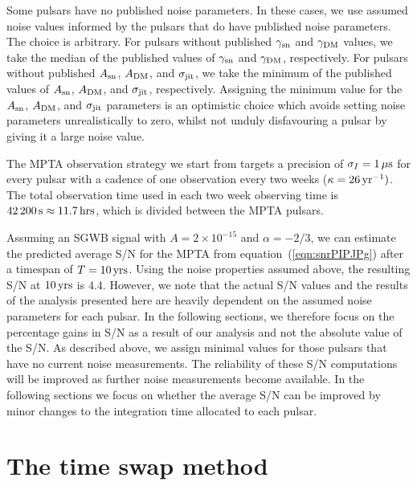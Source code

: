 \documentclass[fleqn,usenatbib]{mnras}
\newcommand{\ARed}{A_{\rm sn}}
\newcommand{\ADM}{A_{\rm DM}}
\newcommand{\TwoWkObsTimeHrs}{11.7}
\newcommand{\TwoWkObsTimeS}{42\,200}
\begin{document}
Some pulsars have no published noise parameters. 
In these cases, we use assumed noise values informed by the pulsars that do have published noise parameters. 
The choice is arbitrary. 
For pulsars without published $\gamma_{\rm sn}$ and $\gamma_{\rm DM}$ values, we take the median of the published values of $\gamma_{\rm sn}$ and $\gamma_{\rm DM}$, respectively.  
For pulsars without published $\ARed$, $\ADM$, and $\sigma_{\rm jit}$, we take the minimum of the published values of $\ARed$, $\ADM$, and $\sigma_{\rm jit}$, respectively. 
Assigning the minimum value for the $\ARed$, $\ADM$, and $\sigma_{\rm jit}$ parameters is an optimistic choice which avoids setting noise parameters unrealistically to zero, whilst not unduly disfavouring a pulsar by giving it a large noise value. 



The MPTA observation strategy we start from targets a precision of $\sigma_I = 1\,{\rm \mu s}$ for every pulsar with a cadence of one observation every two weeks ($\kappa=26\,{\rm yr}^{-1})$.  
The total observation time used in each two week observing time is $\TwoWkObsTimeS\,{\rm s} \approx \TwoWkObsTimeHrs\,{\rm hrs}$, which is divided between the MPTA pulsars. 


Assuming an SGWB signal with $A = 2\times 10^{-15}$ and $\alpha = -2/3$, we can estimate the predicted average S/N for the MPTA from equation~(\ref{eqn:snrPIPJPg}) after a timespan of $T=10\,{\rm yrs}$.
Using the noise properties assumed above, the resulting S/N at $10\,{\rm yrs}$ is $4.4$.
However, we note that the actual S/N values and the results of the analysis presented here are heavily dependent on the assumed noise parameters for each pulsar.
In the following sections, we therefore focus on the percentage gains in S/N as a result of our analysis and not the absolute value of the S/N.
As described above, we assign minimal values for those pulsars that have no current noise measurements. 
The reliability of these S/N computations will be improved as further noise measurements become available. 
In the following sections we focus on whether the average S/N can be improved by minor changes to the integration time allocated to each pulsar. 


\section{The time swap method}
\label{sec:timeshuffle}
\end{document}
